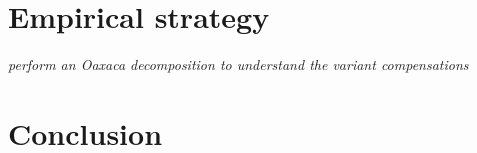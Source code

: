 \documentclass[12pt,a4paper]{article}
\begin{document}
\section{Empirical strategy}
\label{sec:empirical}

\emph{perform an Oaxaca decomposition to understand the variant compensations}

\section{Conclusion}
\label{sec:conclusion}

\newpage


\end{document}
